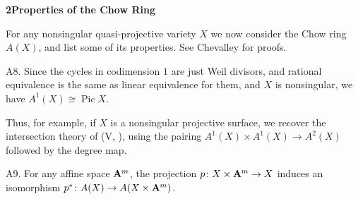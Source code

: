 {\bigskip
\noindent\hypertarget{sec-A-2}{}{\large\bfseries 2\quad Properties of the Chow Ring}\par
\medskip
\noindent For any nonsingular quasi-projective variety $X$ we now consider the Chow ring $A(X)$, and list some of its properties. See Chevalley  for proofs.

\hypertarget{axiom-A-A8}{}A8. Since the cycles in codimension $1$ are just Weil divisors, and rational equivalence is the same as linear equivalence for them, and $X$ is nonsingular, we have $A^1(X)\cong\operatorname{Pic} X$.

Thus, for example, if $X$ is a nonsingular projective surface, we recover the intersection theory of (V, ), using the pairing $A^1(X)\times A^1(X)\to A^2(X)$ followed by the degree map.

\hypertarget{axiom-A-A9}{}A9. For any affine space $\AffSpace{m}$, the projection $p\colon X\times\AffSpace{m}\to X$ induces an isomorphism $p^*\colon A(X)\to A(X\times\AffSpace{m})$.
}
